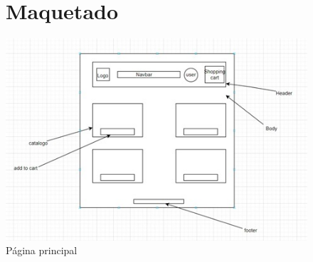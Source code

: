 \documentclass{article}
\begin{document}
\begin{figure}
\section{Maquetado}
    \centering
    \includegraphics[width=1.1\linewidth]{pag.jpg}    \caption{Página principal}
    \label{fig:enter-label}
\end{figure}
\end{document}
